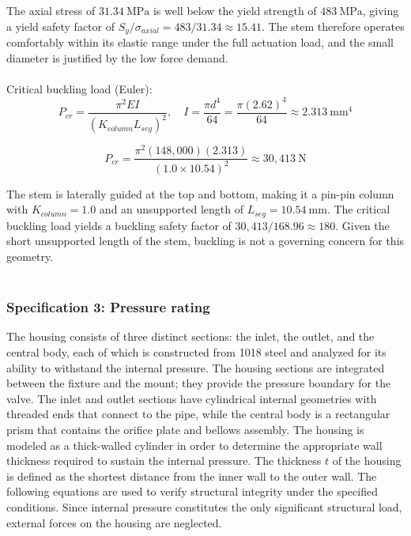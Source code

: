 \documentclass[12pt, letterpaper]{report}%
\newcounter{mycounter}           %
\newcounter{sub}[mycounter]      %
\begin{document}
                The axial stress of $31.34\ \text{MPa}$ is well below the yield strength of $483\ \text{MPa}$, giving a yield safety factor of $S_y / \sigma_{axial} = 483 / 31.34 \approx 15.41$.
                The stem therefore operates comfortably within its elastic range under the full actuation load, and the small diameter is justified by the low force demand.
                \\~\\
                Critical buckling load (Euler):
                \begin{equation}
                P_{cr} = \frac{\pi^2 E I}{(K_{column} L_{seg})^2}, \quad I = \frac{\pi d^4}{64} = \frac{\pi (2.62)^4}{64} \approx 2.313 \ \text{mm}^4
                \label{crit_buck}
                \end{equation}

                \begin{equation}
                P_{cr} = \frac{\pi^2 (148{,}000)(2.313)}{(1.0 \times 10.54)^2} \approx 30{,}413 \ \text{N}
                \label{crit_buck2}    
                \end{equation}

                The stem is laterally guided at the top and bottom, making it a pin-pin column with $K_{column} = 1.0$ and an unsupported length of $L_{seg} = 10.54\ \text{mm}$.
                The critical buckling load yields a buckling safety factor of $30{,}413 / 168.96 \approx 180$.
                Given the short unsupported length of the stem, buckling is not a governing concern for this geometry.
                \\~\\

        \subsubsection{Specification 3: Pressure rating}
        \label{subsec:valve_spec_3}

            The housing consists of three distinct sections: the inlet, the outlet, and the central body, each of which is constructed from 1018 steel and analyzed for its ability to withstand the internal pressure. 
            The housing sections are integrated between the fixture and the mount; they provide the pressure boundary for the valve. The inlet and outlet sections have cylindrical internal geometries with threaded ends that connect to the pipe, while the central body is a rectangular prism that contains the orifice plate and bellows assembly.
            The housing is modeled as a thick-walled cylinder in order to determine the appropriate wall thickness required to sustain the internal pressure.
            The thickness $t$ of the housing is defined as the shortest distance from the inner wall to the outer wall.
            The following equations are used to verify structural integrity under the specified conditions.
            Since internal pressure constitutes the only significant structural load, external forces on the housing are neglected.
\end{document}
